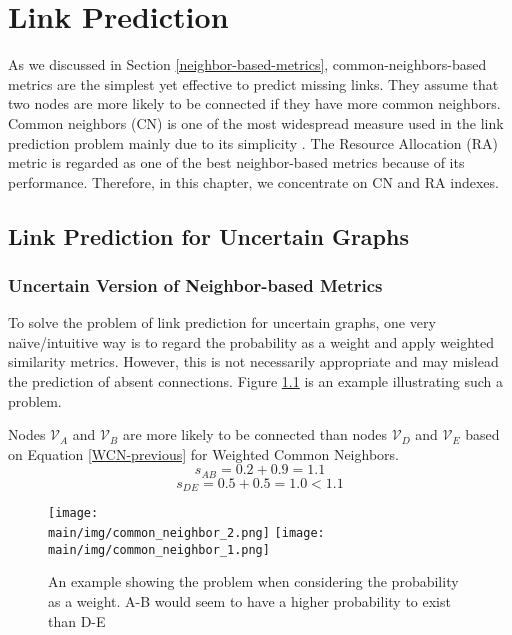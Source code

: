 \documentclass[\main/thesis.tex]{subfiles}
\begin{document}
\chapter{Link Prediction}
As we discussed in Section \ref{neighbor-based-metrics}, common-neighbors-based metrics are the simplest yet effective to predict missing links. They assume that two nodes are more likely to be connected if they have more common neighbors. Common neighbors (CN) is one of the most widespread measure used in the link prediction problem mainly due to its simplicity \cite{newman2001clustering}. The Resource Allocation (RA) metric \cite{zhou2009predicting} is regarded as one of the best neighbor-based metrics because of its performance. Therefore, in this chapter, we concentrate on CN and RA indexes.
\section{Link Prediction for Uncertain Graphs}
\subsection{Uncertain Version of Neighbor-based Metrics} \label{Uncertain-Version-of-Neighbor-based-Metrics}
To solve the problem of link prediction for uncertain graphs, one very na\"{\i}ve/intuitive way is to regard the probability as a weight and apply weighted similarity metrics. However, this is not necessarily appropriate and may mislead the prediction of absent connections. Figure \ref{problem-consider-probability-as-weight-link} is an example illustrating such a problem.

Nodes $\mathcal{V}_A$ and $\mathcal{V}_B$ are more likely to be connected than nodes $\mathcal{V}_D$ and $\mathcal{V}_E$ based on Equation \ref{WCN-previous} for Weighted Common Neighbors.
\begin{equation}
s_{AB} = 0.2 + 0.9 = 1.1
\end{equation}
\begin{equation}
s_{DE} = 0.5 + 0.5 = 1.0 < 1.1
\end{equation}

\begin{figure}
\texttt{[image: \\main/img/common\_neighbor\_2.png]}
\texttt{[image: \\main/img/common\_neighbor\_1.png]}
\centering
\caption{An example showing the problem when considering the probability as a weight. A-B would seem to have a higher probability to exist than D-E}
\label{problem-consider-probability-as-weight-link}
\end{figure}
\end{document}
